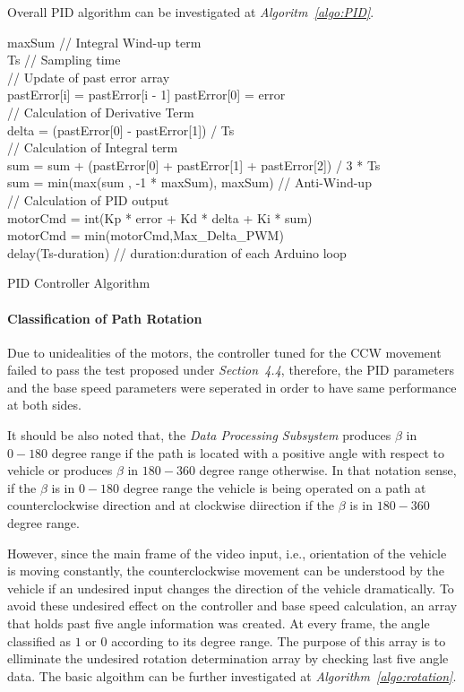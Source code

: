 \documentclass[a4paper,12pt]{article}
\begin{document}
\begin{enumerate}
	Overall PID algorithm can be investigated at \textit{Algoritm~\ref{algo:PID}}.
	
	\begin{algorithm}
		\DontPrintSemicolon	
		maxSum // Integral Wind-up term \\
		Ts // Sampling time \\
		// Update of past error array \\
		 {
			pastError[i] = pastError[i - 1] 
		} 
		pastError[0] = error \\
		// Calculation of Derivative Term \\
		delta = (pastError[0] - pastError[1]) / Ts \\
		// Calculation of Integral term \\
		sum = sum + (pastError[0] + pastError[1] + pastError[2]) / 3 * Ts \\
		sum = min(max(sum , -1 * maxSum), maxSum) // Anti-Wind-up  \\
		// Calculation of PID output \\
		motorCmd = int(Kp * error + Kd * delta + Ki * sum)	\\	
		motorCmd =  min(motorCmd,Max\_Delta\_PWM) \\
		delay(Ts-duration) // duration:duration of each Arduino loop	
		\caption{PID Controller Algorithm}
		\label{algo:PID}
	\end{algorithm}
	
	\paragraph*{Classification of Path Rotation}
	
	Due to unidealities of the motors, the controller tuned for the CCW movement failed to pass the test proposed under \textit{Section~4.4}, therefore, the PID parameters and the base speed parameters were seperated in order to have same performance at both sides. 
	
	It should be also noted that, the \textit{Data Processing Subsystem} produces $\beta$ in $0-180$ degree range if the path is located with a positive angle with respect to vehicle or produces $\beta$ in $180-360$ degree range otherwise.
	In that notation sense, if the $\beta$ is in $0-180$ degree range the vehicle is being operated on a path at counterclockwise direction and at clockwise diirection if the $\beta$ is in $180-360$ degree range.
	
	However, since the main frame of the video input, i.e., orientation of the vehicle is moving constantly, the counterclockwise movement can be understood by the vehicle if an undesired input changes the direction of the vehicle dramatically. To avoid these undesired effect on the controller and base speed calculation, an array that holds past five angle information was created. At every frame, the angle classified as $1$ or $0$ according to its degree range. The purpose of this array is to elliminate the undesired rotation determination array by checking last five angle data. The basic algoithm can be further investigated at \textit{Algorithm~\ref{algo:rotation}}. 
	

\end{enumerate}
\end{document}
